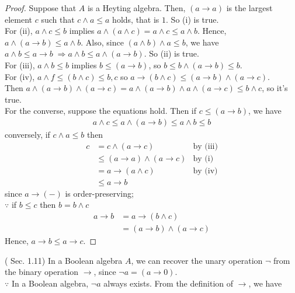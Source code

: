 \documentclass[a4j,12pt]{jarticle}
\numberwithin{equation}{section}
\begin{document}
\begin{proof}
  Suppose that $A$ is a Heyting algebra. Then, $(a \rightarrow a)$ is the largest element $c$ such that $c \wedge a \le a$ holds, that is $1$. So (i) is true.\\
  For (ii), $a \wedge c \le b$ implies $a \wedge (a \wedge c) = a \wedge c \le a \wedge b$. Hence, $a \wedge (a \rightarrow b) \le a \wedge b$. Also, since $(a \wedge b) \wedge a \le b$, we have $a \wedge b \le a \rightarrow b \; \Rightarrow a \wedge b \le a \wedge (a \rightarrow b)$. So (ii) is true.\\
  For (iii), $a \wedge b \le b$ implies $b \le (a \rightarrow b)$, so $b \le b \wedge (a \rightarrow b) \le b$.\\
  For (iv), $a \wedge f \le (b \wedge c) \le b, c$ so $a \rightarrow (b \wedge c) \le (a \rightarrow b) \wedge (a \rightarrow c)$.\\
  Then $a \wedge (a \rightarrow b) \wedge (a \rightarrow c) = a \wedge (a \rightarrow b) \wedge a \wedge (a \rightarrow c) \le b \wedge c$, so it's true.\\
  For the converse, suppose the equations hold. Then if $c \le (a \rightarrow b)$, we have
  \begin{align*}
    a \wedge c \le a \wedge (a \rightarrow b) \le a \wedge b \le b
  \end{align*}
  conversely, if $c \wedge a \le b$ then
  \begin{align*}
    c &= c \wedge (a \rightarrow c) & \text{by (iii)} \\
      &\le(a \rightarrow a) \wedge (a \rightarrow c) & \text{by (i)} \\
      &=a \rightarrow (a \wedge c) & \text{by (iv)} \\
      &\le a \rightarrow b
  \end{align*}
  since $a \rightarrow (-)$ is order-preserving;\\
  $\because$ if $b \le c$ then $b = b \wedge c$
  \begin{align*}
    a \rightarrow b &= a \rightarrow (b \wedge c) \\
                    &= (a \rightarrow b) \wedge (a \rightarrow c)
  \end{align*}
  Hence, $a \rightarrow b \le a \rightarrow c$.
\end{proof}
(\cite{Stone} Sec. 1.11) In a Boolean algebra $A$, we can recover the unary operation $\neg$ from the binary operation $\rightarrow$, since $\neg a = (a \rightarrow 0)$.\\
$\because$ In a Boolean algebra, $\neg a$ always exists. From the definition of $\rightarrow$, we have
\end{document}
